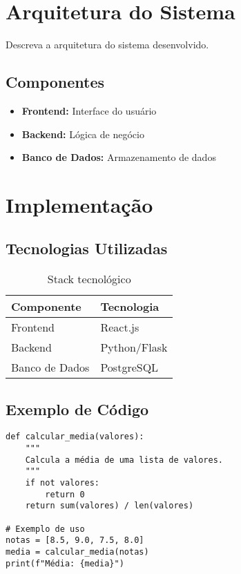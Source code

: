 \documentclass[12pt,a4paper]{article}
\begin{document}
\section{Arquitetura do Sistema}

Descreva a arquitetura do sistema desenvolvido.

\subsection{Componentes}

\begin{itemize}
  \item \textbf{Frontend:} Interface do usuário
  \item \textbf{Backend:} Lógica de negócio
  \item \textbf{Banco de Dados:} Armazenamento de dados
\end{itemize}

\section{Implementação}

\subsection{Tecnologias Utilizadas}

\begin{table}[h]
  \centering
  \begin{tabular}{|l|l|}
    \hline
    \textbf{Componente} & \textbf{Tecnologia} \\
    \hline
    Frontend & React.js \\
    Backend & Python/Flask \\
    Banco de Dados & PostgreSQL \\
    \hline
  \end{tabular}
  \caption{Stack tecnológico}
  \label{tab:tecnologias}
\end{table}

\subsection{Exemplo de Código}

\begin{lstlisting}[caption=Exemplo de função em Python]
def calcular_media(valores):
    """
    Calcula a média de uma lista de valores.
    """
    if not valores:
        return 0
    return sum(valores) / len(valores)

# Exemplo de uso
notas = [8.5, 9.0, 7.5, 8.0]
media = calcular_media(notas)
print(f"Média: {media}")
\end{lstlisting}
\end{document}
